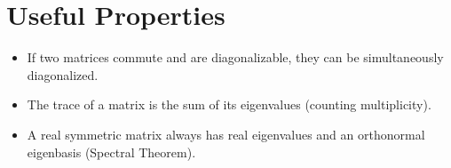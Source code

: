 \section{Useful Properties}
\begin{itemize}
    \item If two matrices commute and are diagonalizable, they can be simultaneously diagonalized.
    \item The trace of a matrix is the sum of its eigenvalues (counting multiplicity).
    \item A real symmetric matrix always has real eigenvalues and an orthonormal eigenbasis (Spectral Theorem).
\end{itemize}
